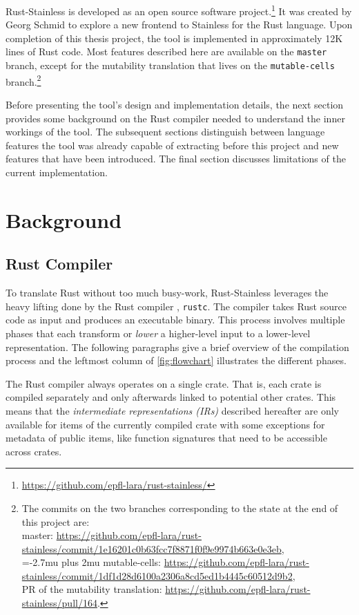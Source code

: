 Rust-Stainless is developed as an open source software
project.\footnote{\url{https://github.com/epfl-lara/rust-stainless/}} It was
created by Georg Schmid to explore a new frontend to Stainless for the Rust
language. Upon completion of this thesis project, the tool is implemented in
approximately 12K lines of Rust code. Most features described here are available
on the \lstinline!master! branch, except for the mutability translation that
lives on the \lstinline!mutable-cells! branch.\footnote{The commits on the two
branches corresponding to the state at the end of this project are: \\ master:
\url{https://github.com/epfl-lara/rust-stainless/commit/1e16201c0b63fcc7f8871f0f9e9974b663e0e3eb},\\
{\Urlmuskip=-2.7mu plus 2mu
mutable-cells:
\url{https://github.com/epfl-lara/rust-stainless/commit/1df1d28d6100a2306a8cd5ed1b4445c60512d9b2},
}\\ PR of the mutability translation:
\url{https://github.com/epfl-lara/rust-stainless/pull/164}.}

Before presenting the tool's design and implementation details, the next section
provides some background on the Rust compiler needed to understand the inner
workings of the tool. The subsequent sections distinguish between language
features the tool was already capable of extracting before this project and new
features that have been introduced. The final section discusses limitations of
the current implementation.


\section{Background}

\subsection{Rust Compiler}

To translate Rust without too much busy-work, Rust-Stainless leverages the heavy
lifting done by the Rust compiler \cite{rustc-guide}, \lstinline!rustc!. The
compiler takes Rust source code as input and produces an executable binary. This
process involves multiple phases that each transform or \emph{lower} a
higher-level input to a lower-level representation. The following paragraphs
give a brief overview of the compilation process and the leftmost column of
\autoref{fig:flowchart} illustrates the different phases.

The Rust compiler always operates on a single crate. That is, each crate is
compiled separately and only afterwards linked to potential other crates. This
means that the \emph{intermediate representations (IRs)} described hereafter are
only available for items of the currently compiled crate with some exceptions
for metadata of public items, like function signatures that need to be
accessible across crates.

